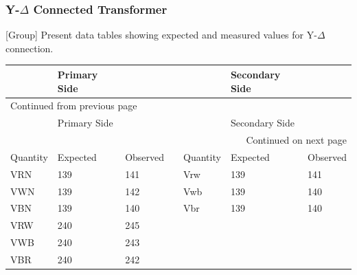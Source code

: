 \documentclass[11pt]{article}
\begin{document}
\subsubsection{Y-\(\Delta\) Connected Transformer}
\label{sec:org5655e82}
{[}Group] Present data tables showing expected and measured values for Y-\(\Delta\) connection.
\begin{longtable}{|l|l|l|l|l|l|l|}
\hline
 & Primary Side &  &  &  & Secondary Side & \\
\hline
\endfirsthead
\multicolumn{7}{l}{Continued from previous page} \\
\hline

 & Primary Side &  &  &  & Secondary Side &  \\

\hline
\endhead
\hline\multicolumn{7}{r}{Continued on next page} \\
\endfoot
\endlastfoot
\hline
Quantity & Expected & Observed &  & Quantity & Expected & Observed\\
\hline
VRN & 139 & 141 &  & Vrw & 139 & 141\\
\hline
VWN & 139 & 142 &  & Vwb & 139 & 140\\
\hline
VBN & 139 & 140 &  & Vbr & 139 & 140\\
\hline
VRW & 240 & 245 &  &  &  & \\
\hline
VWB & 240 & 243 &  &  &  & \\
\hline
VBR & 240 & 242 &  &  &  & \\
\hline
\end{longtable}
\end{document}
